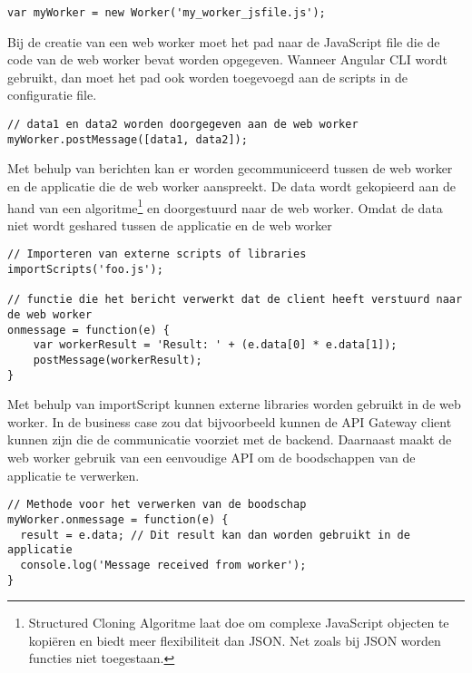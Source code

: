 \begin{lstlisting}[caption=Creatie van een web worker]
var myWorker = new Worker('my_worker_jsfile.js');
\end{lstlisting}

Bij de creatie van een web worker moet het pad naar de JavaScript file die de code van de web worker bevat worden opgegeven. Wanneer Angular CLI wordt gebruikt, dan moet het pad ook worden toegevoegd aan de scripts in de configuratie file. 

\begin{lstlisting}[caption=Communicatie tussen applicatie en web worker]
// data1 en data2 worden doorgegeven aan de web worker
myWorker.postMessage([data1, data2]);
\end{lstlisting}

Met behulp van berichten kan er worden gecommuniceerd tussen de web worker en de applicatie die de web worker aanspreekt. De data wordt gekopieerd aan de hand van een algoritme\autocite{structured-cloning-algoritme}\footnote{Structured Cloning Algoritme laat doe om complexe JavaScript objecten te kopi\"eren en biedt meer flexibiliteit dan JSON. Net zoals bij JSON worden functies niet toegestaan. } en doorgestuurd naar de web worker. Omdat de data niet wordt geshared tussen de applicatie en de web worker

\begin{lstlisting}[caption=Voorbeeld hoe een web worker een boodschap verwerkt]
// Importeren van externe scripts of libraries
importScripts('foo.js'); 

// functie die het bericht verwerkt dat de client heeft verstuurd naar de web worker
onmessage = function(e) {
	var workerResult = 'Result: ' + (e.data[0] * e.data[1]);
	postMessage(workerResult);
}
\end{lstlisting}

Met behulp van importScript kunnen externe libraries worden gebruikt in de web worker. In de business case zou dat bijvoorbeeld kunnen de API Gateway client kunnen zijn die de communicatie voorziet met de backend. Daarnaast maakt de web worker gebruik van een eenvoudige API om de boodschappen van de applicatie te verwerken.

\begin{lstlisting}[caption=Voorbeeld van hoe de applicatie de respons van een web worker verwerkt]
// Methode voor het verwerken van de boodschap
myWorker.onmessage = function(e) {
  result = e.data; // Dit result kan dan worden gebruikt in de applicatie
  console.log('Message received from worker');
}
\end{lstlisting}

